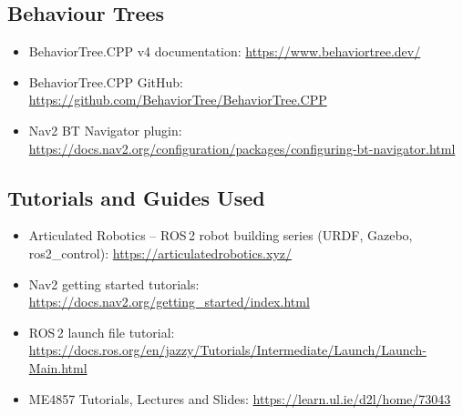 \documentclass[12pt, a4paper]{article}
\begin{document}
\subsection{Behaviour Trees}
\begin{itemize}
    \item BehaviorTree.CPP v4 documentation: \url{https://www.behaviortree.dev/}
    \item BehaviorTree.CPP GitHub: \url{https://github.com/BehaviorTree/BehaviorTree.CPP}
    \item Nav2 BT Navigator plugin: \url{https://docs.nav2.org/configuration/packages/configuring-bt-navigator.html}
\end{itemize}

\subsection{Tutorials and Guides Used}
\begin{itemize}
    \item Articulated Robotics -- ROS\,2 robot building series (URDF, Gazebo, ros2\_control): \url{https://articulatedrobotics.xyz/}
    \item Nav2 getting started tutorials: \url{https://docs.nav2.org/getting_started/index.html}
    \item ROS\,2 launch file tutorial: \url{https://docs.ros.org/en/jazzy/Tutorials/Intermediate/Launch/Launch-Main.html}
    \item ME4857 Tutorials, Lectures and Slides: \url{https://learn.ul.ie/d2l/home/73043}
\end{itemize}
\end{document}
